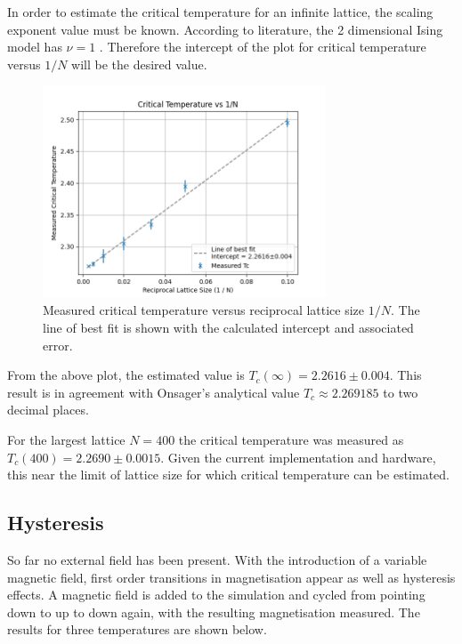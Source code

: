 \documentclass[a4paper, 12pt]{article}
\begin{document}
In order to estimate the critical temperature for an infinite lattice, the scaling exponent value must be known. According to literature, the 2 dimensional Ising model has \(\nu = 1\) \cite{6}. Therefore the intercept of the plot for critical temperature versus \( 1/N \) will be the desired value.

\begin{figure}[H]
\centering
\includegraphics[width=0.75\textwidth]{./resources/infinite_tc_estimate.png}
\caption{Measured critical temperature versus reciprocal lattice size \(1/N\). The line of best fit is shown with the calculated intercept and associated error.}
\end{figure}

From the above plot, the estimated value is \( T_c(\infty) = 2.2616 \pm 0.004\). This result is in agreement with Onsager's analytical value \(T_c \approx 2.269185\) to two decimal places. 

For the largest lattice \(N=400\) the critical temperature was measured as \( T_c ( 400 ) = 2.2690 \pm 0.0015 \). Given the current implementation and hardware, this near the limit of lattice size for which critical temperature can be estimated.


\subsection{Hysteresis}
So far no external field has been present. With the introduction of a variable magnetic field, first order transitions in magnetisation appear as well as hysteresis effects. A magnetic field is added to the simulation and cycled from pointing down to up to down again, with the resulting magnetisation measured. The results for three temperatures are shown below.
\end{document}
